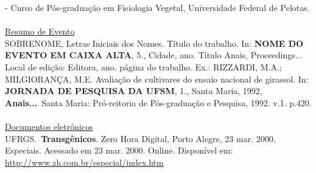\documentclass[12pt, a4paper]{article}
\begin{document}
	- Curso de Pós-graduação em Fisiologia 	Vegetal, Universidade Federal de 
	Pelotas.
	\\\\
	\underline{Resumo de Evento}
	\\
	SOBRENOME, Letras Iniciais dos Nomes. Título do trabalho. In: \textbf{NOME 
	DO EVENTO EM CAIXA ALTA}, 5., Cidade, ano. Título Anais, Proceedings... 
	Local de edição: Editora, ano. página do trabalho.	Ex.: RIZZARDI, M.A.; 
	MILGIORANÇA, M.E. Avaliação de cultivares do ensaio 	nacional de 
	girassol. In: \textbf{JORNADA DE PESQUISA DA UFSM}, 1., Santa Maria, 1992, 
	\textbf{Anais...} Santa Maria: Pró-reitoria de Pós-graduação e Pesquisa, 
	1992. v.1. p.420.
	\\\\
	\underline{Documentos eletrônicos}
	\\
	UFRGS. \textbf{Transgênicos}. Zero Hora Digital, Porto Alegre, 23 mar. 
	2000. Especiais. Acessado em 23 mar. 2000. Online. Disponível em: 
	\url{http://www.zh.com.br/especial/index.htm}
\end{document}

